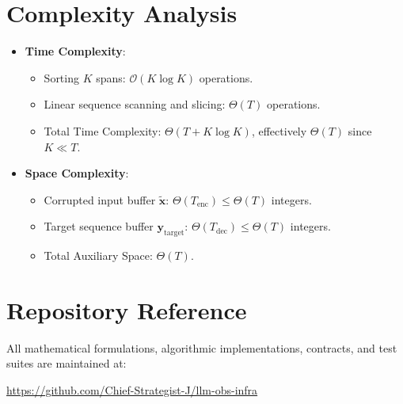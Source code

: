 \documentclass[11pt,a4paper]{article}
\theoremstyle{definition}
\begin{document}
\section{Complexity Analysis}
\begin{itemize}
    \item \textbf{Time Complexity}:
    \begin{itemize}
        \item Sorting $K$ spans: $\mathcal{O}(K \log K)$ operations.
        \item Linear sequence scanning and slicing: $\Theta(T)$ operations.
        \item Total Time Complexity: $\Theta(T + K \log K)$, effectively $\Theta(T)$ since $K \ll T$.
    \end{itemize}
    \item \textbf{Space Complexity}:
    \begin{itemize}
        \item Corrupted input buffer $\tilde{\mathbf{x}}$: $\Theta(T_{\text{enc}}) \le \Theta(T)$ integers.
        \item Target sequence buffer $\mathbf{y}_{\text{target}}$: $\Theta(T_{\text{dec}}) \le \Theta(T)$ integers.
        \item Total Auxiliary Space: $\Theta(T)$.
    \end{itemize}
\end{itemize}

\section{Repository Reference}
All mathematical formulations, algorithmic implementations, contracts, and test suites are maintained at:
\begin{center}
\url{https://github.com/Chief-Strategist-J/llm-obs-infra}
\end{center}
\end{document}
